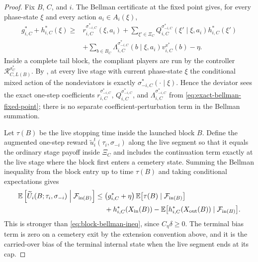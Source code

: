 \documentclass[12pt]{article}
\theoremstyle{definition}
\newcommand{\E}{\mathbb{E}}
\newcommand{\1}{\mathbf{1}}
\newcommand{\cF}{\mathcal{F}}
\begin{document}
\begin{proof}
Fix $B$, $C$, and $i$. The Bellman certificate at the fixed point gives, for
every phase-state $\xi$ and every action $a_i\in A_i(\xi)$,
\begin{align}
\label{eq:exact-bellman-fixed-point}
g_{i,C}^* + h_{i,C}^*(\xi)
\ge {}
&r_{i,C}^{\sigma_{-i,C}^*}(\xi,a_i)
+
\sum_{\xi'\in\Xi_C}Q_{i,C}^{\sigma_{-i,C}^*}(\xi'\mid\xi,a_i)h_{i,C}^*(\xi')
\\
&+
\sum_{b\in B_C}\Lambda_{i,C}^{\sigma_{-i,C}^*}(b\mid\xi,a_i)v_{i,C}^{x^*}(b)
-\eta.
\nonumber
\end{align}
Inside a complete tail block, the compliant players are run by the controller
$\mathcal R_{C,L(B)}^{\sigma_C^*}$. By , at every live
stage with current phase-state $\xi$ the conditional mixed action of the
nondeviators is exactly $\sigma_{-i,C}^*(\cdot\mid\xi)$. Hence the deviator sees
the exact one-step coefficients
$r_{i,C}^{\sigma_{-i,C}^*}$, $Q_{i,C}^{\sigma_{-i,C}^*}$, and
$\Lambda_{i,C}^{\sigma_{-i,C}^*}$ from
\eqref{eq:exact-bellman-fixed-point}; there is no separate
coefficient-perturbation term in the Bellman summation.

Let $\tau(B)$ be the live stopping time inside the launched block $B$. Define the
augmented one-step reward $\widetilde u_i^t(\tau_i,\sigma_{-i})$ along the live
segment so that it equals the ordinary stage payoff inside $\Xi_C$ and includes
the continuation term exactly at the live stage where the block first enters a
cemetery state. Summing the Bellman inequality from the block entry up to time
$\tau(B)$ and taking conditional expectations gives
\begin{align*}
\E\left[\widetilde U_i(B;\tau_i,\sigma_{-i})\Bigm|\cF_{\mathrm{in}(B)}\right]
\le{}&
\bigl(g_{i,C}^*+\eta\bigr)\,
\E\bigl[\tau(B)\mid\cF_{\mathrm{in}(B)}\bigr]
\\
&+
h_{i,C}^*(X_{\mathrm{in}}(B))
-
\E\bigl[h_{i,C}^*(X_{\mathrm{out}}(B))\mid\cF_{\mathrm{in}(B)}\bigr].
\end{align*}
This is stronger than \eqref{eq:block-bellman-ineq}, since $C_\eta\delta\ge 0$.
The terminal bias term is zero on a cemetery exit by the extension convention
above, and it is the carried-over bias of the terminal internal state when the
live segment ends at its cap.
\end{proof}
\end{document}
